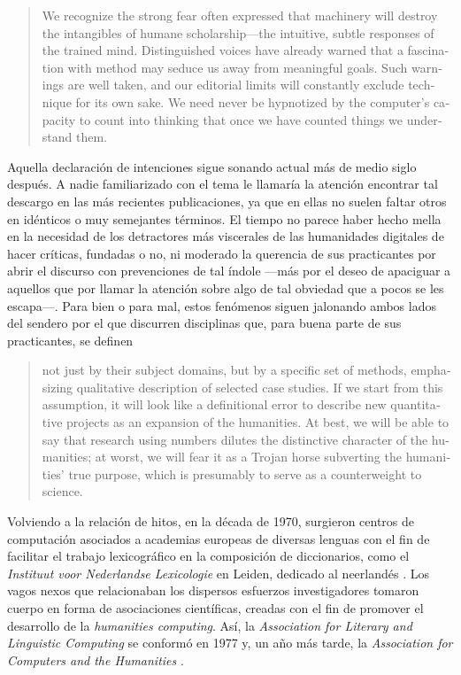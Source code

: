 \blockquote{\begin{english}We recognize the strong fear often expressed that machinery will destroy the intangibles of humane scholarship—the intuitive, subtle responses of the trained mind. Distinguished voices have already warned that a fascination with method may seduce us away from meaningful goals. Such warnings are well taken, and our editorial limits will constantly exclude technique for its own sake. We need never be hypnotized by the computer's capacity to count into thinking that once we have counted things we understand them.\end{english} \parencite{prospect1966}}

Aquella declaración de intenciones sigue sonando actual más de medio siglo después. A nadie familiarizado con el tema le llamaría la atención encontrar tal descargo en las más recientes publicaciones, ya que en ellas no suelen faltar otros en idénticos o muy semejantes términos. El tiempo no parece haber hecho mella en la necesidad de los detractores más viscerales de las humanidades digitales de hacer críticas, fundadas o no, ni moderado la querencia de sus practicantes por abrir el discurso con prevenciones de tal índole —más por el deseo de apaciguar a aquellos que por llamar la atención sobre algo de tal obviedad que a pocos se les escapa—. Para bien o para mal, estos fenómenos siguen jalonando ambos lados del sendero por el que discurren disciplinas que, para buena parte de sus practicantes, se definen

\blockquote{\begin{english}not just by their subject domains, but by a specific set of methods, emphasizing qualitative description of selected case studies. If we start from this assumption, it will look like a definitional error to describe new quantitative projects as an expansion of the humanities. At best, we will be able to say that research using numbers dilutes the distinctive character of the humanities; at worst, we will fear it as a Trojan horse subverting the humanities' true purpose, which is presumably to serve as a counterweight to science.\end{english} \parencite{underwood2019}} 

		Volviendo a la relación de hitos, en la década de 1970, surgieron centros de computación asociados a academias europeas de diversas lenguas con el fin de facilitar el trabajo lexicográfico en la composición de diccionarios, como el \textit{Instituut voor Nederlandse Lexicologie} en Leiden, dedicado al neerlandés \parencite[4]{hockey2004}. Los vagos nexos que relacionaban los dispersos esfuerzos investigadores tomaron cuerpo en forma de asociaciones científicas, creadas con el fin de promover el desarrollo de la \textit{humanities computing}. Así, la \textit{Association for Literary and Linguistic Computing} se conformó en 1977 y, un año más tarde, la \textit{Association for Computers and the Humanities} \parencite[8]{hockey2004}.

